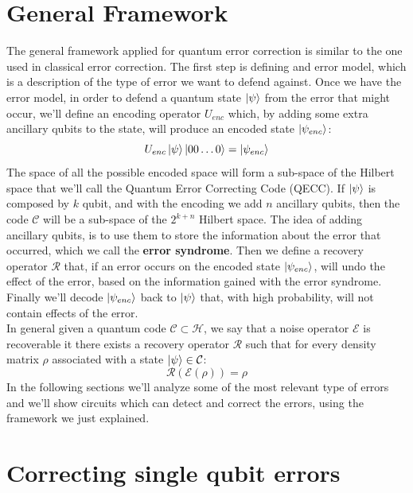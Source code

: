 \documentclass{article}
\begin{document}
	\section{General Framework}
	The general framework applied for quantum error correction is similar to the one used in classical error correction. The first step is defining and error model, which is a description of the type of error we want to defend against. Once we have the error model, in order to defend a quantum state $\ket{\psi}$ from the error that might occur, we'll define an encoding operator $U_{enc}$ which, by adding some extra ancillary qubits to the state, will produce an encoded state $\ket{\psi_{enc}}$:
	\[ U_{enc}\ket{\psi}\ket{00\dots0} = \ket{\psi_{enc}} \]
	The space of all the possible encoded space will form a sub-space of the Hilbert space that we'll call the Quantum Error Correcting Code (QECC). If $\ket{\psi}$ is composed by $k$ qubit, and with the encoding we add $n$ ancillary qubits, then the code $\mathcal{C}$ will be a sub-space of the $2^{k+n}$ Hilbert space. The idea of adding ancillary qubits, is to use them to store the information about the error that occurred, which we call the \textbf{error syndrome}. Then we define a recovery operator $\mathcal{R}$ that, if an error occurs on the encoded state $\ket{\psi_{enc}}$, will undo the effect of the error, based on the information gained with the error syndrome. Finally we'll decode $\ket{\psi_{enc}}$ back to $\ket{\psi}$ that, with high probability, will not contain effects of the error.\\
	In general given a quantum code $\mathcal{C} \subset \mathcal{H}$, we say that a noise operator $\mathcal{E}$ is recoverable it there exists a recovery operator $\mathcal{R}$ such that for every density matrix $\rho$ associated with a state $\ket{\psi} \in \mathcal{C}$:
	\[ \mathcal{R(\mathcal{E}(\rho))} = \rho\]
	In the following sections we'll analyze some of the most relevant type of errors and we'll show circuits which can detect and correct the errors, using the framework we just explained.	
		
	\section{Correcting single qubit errors}
\end{document}
